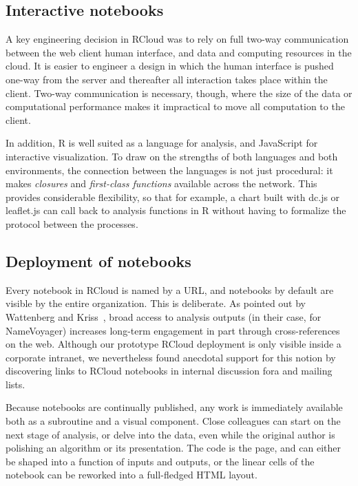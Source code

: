 \subsection{Interactive notebooks\label{sec:interactivenotebooks}}




A key engineering decision in RCloud was to rely on full two-way
communication between the web client human interface, and data and
computing resources in the cloud. It is easier to engineer a design
in which the human interface is pushed one-way from the server
and thereafter all interaction takes place within the client.
Two-way communication is necessary, though, where the size of
the data or computational performance makes it impractical to
move all computation to the client.

In addition, R is well suited as a language for analysis, and
JavaScript for interactive visualization. To draw on
the strengths of both languages and both environments, the connection
between the languages is not just procedural: it makes \emph{closures}
and \emph{first-class functions} available across the network.
This provides considerable flexibility, so that for example, a chart built
with dc.js or leaflet.js can call back to analysis functions in R
without having to formalize the protocol between the processes.

\subsection{Deployment of notebooks\label{sec:deployment}}

Every notebook in RCloud is named by a URL, and notebooks by
default are visible by the entire organization. This is deliberate.
As pointed out by Wattenberg and Kriss~\cite{Wattenberg:2011:DFS},
broad access to analysis outputs (in their case, for NameVoyager)
increases long-term engagement in part through cross-references on
the web. Although our prototype RCloud deployment is only visible
inside a corporate intranet, we nevertheless found anecdotal support
for this notion by discovering links to RCloud notebooks in internal
discussion fora and mailing lists.

Because notebooks are continually published, any work is immediately
available both as a subroutine and a visual component. Close colleagues
can start on the next stage of analysis, or delve into the data,
even while the original author is polishing an algorithm or its
presentation. The code is the page, and can either be shaped into
a function of inputs and outputs, or the linear cells of the notebook
can be reworked into a full-fledged HTML layout.
